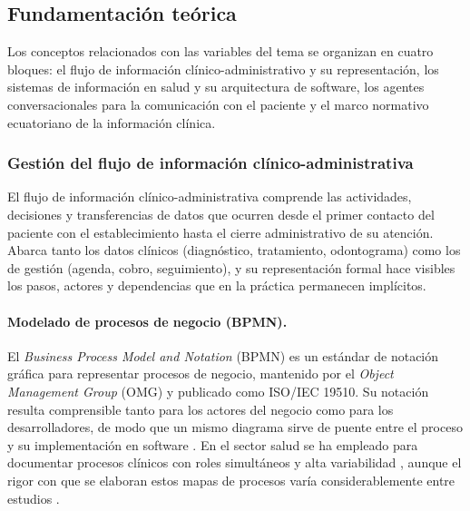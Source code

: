 
\subsection{Fundamentación teórica}

Los conceptos relacionados con las variables del tema se organizan en cuatro
bloques: el flujo de información clínico-administrativo y su representación, los
sistemas de información en salud y su arquitectura de software, los agentes
conversacionales para la comunicación con el paciente y el marco normativo
ecuatoriano de la información clínica.

\subsubsection{Gestión del flujo de información clínico-administrativa}

El flujo de información clínico-administrativa comprende las actividades,
decisiones y transferencias de datos que ocurren desde el primer contacto del
paciente con el establecimiento hasta el cierre administrativo de su atención. Abarca
tanto los datos clínicos (diagnóstico, tratamiento, odontograma) como los de gestión
(agenda, cobro, seguimiento), y su representación formal hace visibles los pasos,
actores y dependencias que en la práctica permanecen implícitos.

\paragraph{Modelado de procesos de negocio (BPMN).}

El \textit{Business Process Model and Notation} (BPMN) es un estándar de notación
gráfica para representar procesos de negocio, mantenido por el \textit{Object
Management Group} (OMG) y publicado como ISO/IEC 19510. Su notación resulta
comprensible tanto para los actores del negocio como para los desarrolladores, de
modo que un mismo diagrama sirve de puente entre el proceso y su implementación en
software \cite{omg2024bpmn}. En el sector salud se ha empleado para documentar
procesos clínicos con roles simultáneos y alta variabilidad \cite{pufahl2022bpmn},
aunque el rigor con que se elaboran estos mapas de procesos varía considerablemente
entre estudios \cite{antonacci2021process}.

